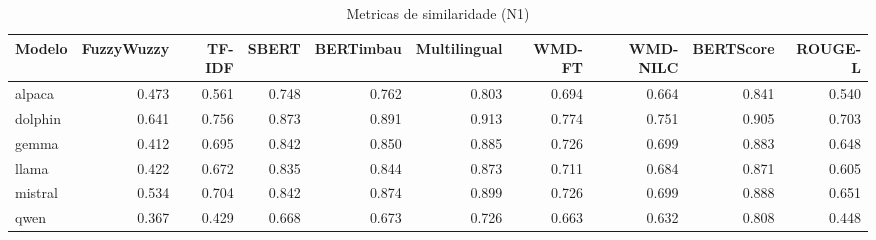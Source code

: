\begin{table}[ht]
  \centering
  \caption{Metricas de similaridade (N1)}
  \label{tab:results_n1_similarity}
  \begin{tabular}{lrrrrrrrrr}
    \toprule
    Modelo & FuzzyWuzzy & TF-IDF & SBERT & BERTimbau & Multilingual & WMD-FT & WMD-NILC & BERTScore & ROUGE-L \\
    \midrule
    alpaca & 0.473 & 0.561 & 0.748 & 0.762 & 0.803 & 0.694 & 0.664 & 0.841 & 0.540 \\
    dolphin & 0.641 & 0.756 & 0.873 & 0.891 & 0.913 & 0.774 & 0.751 & 0.905 & 0.703 \\
    gemma & 0.412 & 0.695 & 0.842 & 0.850 & 0.885 & 0.726 & 0.699 & 0.883 & 0.648 \\
    llama & 0.422 & 0.672 & 0.835 & 0.844 & 0.873 & 0.711 & 0.684 & 0.871 & 0.605 \\
    mistral & 0.534 & 0.704 & 0.842 & 0.874 & 0.899 & 0.726 & 0.699 & 0.888 & 0.651 \\
    qwen & 0.367 & 0.429 & 0.668 & 0.673 & 0.726 & 0.663 & 0.632 & 0.808 & 0.448 \\
    \bottomrule
  \end{tabular}
\end{table}
